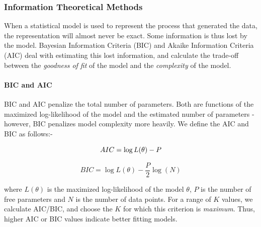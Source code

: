\subsubsection{Information Theoretical Methods} \label{conundrum1}

When a statistical model is used to represent the process that generated the data, the representation will almost never be exact. Some information is thus lost by the model. Bayesian Information Criteria (BIC) and Akaike Information Criteria (AIC) \cite{burnham2004multimodel} deal with estimating this lost information, and calculate the trade-off between the \textit{goodness of fit} of the model and the \textit{complexity} of the model.

\paragraph{BIC and AIC}

BIC and AIC penalize the total number of parameters. Both are functions of the maximized log-likelihood of the model and the estimated number of parameters - however, BIC penalizes model complexity more heavily. We define the AIC and BIC as follows:-

\begin{equation*}
    AIC =  \log L(\theta) - P \\
\end{equation*}

\begin{equation*}
        BIC =  \log L(\theta) - \frac{P}{2}\log(N) 
\end{equation*}

where $L(\theta)$ is the maximized log-likelihood of the model $\theta$, $P$ is the number of free parameters and $N$ is the number of data points. For a range of $K$ values, we calculate AIC/BIC, and choose the $K$ for which this criterion is \textit{maximum}. Thus, higher AIC or BIC values indicate better fitting models. 



